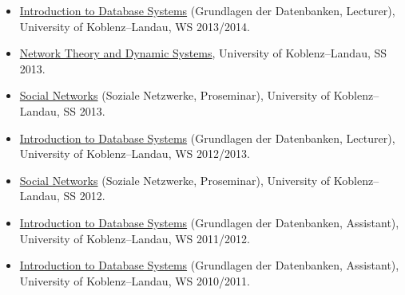 \documentclass[line,margin]{res}
\begin{document}
\begin{resume}
\begin{itemize}
{    Theory and Dynamic Systems}, University of Koblenz--Landau, SS 2014.
\item
  \href{http://west.uni-koblenz.de/teaching/ws1314/GdDB/GdDB}{Introduction
    to Database Systems} (Grundlagen der Datenbanken, 
  Lecturer), University of Koblenz--Landau, WS 2013/2014.
\item 
  \href{https://west.uni-koblenz.de/teaching/ss13/network-theory-and-dynamic-systems}{Network
    Theory and Dynamic Systems}, University of Koblenz--Landau, SS 2013.
\item
  \href{https://west.uni-koblenz.de/teaching/ss13/proseminar-soziale-netzwerke}{Social
  Networks} (Soziale Netzwerke, Proseminar), University of Koblenz--Landau, SS 2013.
\item
  \href{https://www.uni-koblenz-landau.de/campus-koblenz/fb4/west/teaching/ws1213/datenbanken}{Introduction
    to Database Systems} (Grundlagen der Datenbanken, 
  Lecturer), University of Koblenz--Landau, WS 2012/2013.
\item
  \href{https://www.uni-koblenz-landau.de/koblenz/fb4/AGStaab/Teaching/ss12/proseminar-soziale-netzwerke}{Social
  Networks} (Soziale Netzwerke, Proseminar), University of Koblenz--Landau, SS 2012.
\item
  \href{http://www.uni-koblenz-landau.de/koblenz/fb4/AGStaab/Teaching/ws1112/Datenbanken}{Introduction
  to Database Systems} (Grundlagen der Datenbanken, Assistant), University of
  Koblenz--Landau, WS 2011/2012. 
\item 
  \href{http://www.uni-koblenz-landau.de/koblenz/fb4/institute/IFI/AGStaab/Teaching/ws1011/Datenbanken/}{Introduction
  to Database Systems} (Grundlagen der Datenbanken, Assistant), University of
  Koblenz--Landau, WS 2010/2011. 
\end{itemize}


\end{resume}
\end{document}
